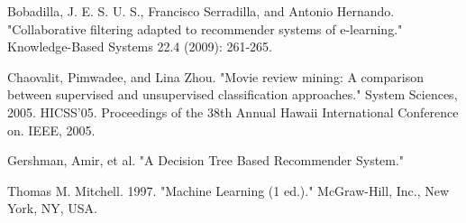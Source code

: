 \documentclass[twoside]{article}
\begin{document}
\begin{multicols}{2}
\begin{thebibliography}{9}
Bobadilla, J. E. S. U. S., Francisco Serradilla, and Antonio Hernando. "Collaborative filtering adapted to recommender systems of e-learning." Knowledge-Based Systems 22.4 (2009): 261-265.

Chaovalit, Pimwadee, and Lina Zhou. "Movie review mining: A comparison between supervised and unsupervised classification approaches." System Sciences, 2005. HICSS'05. Proceedings of the 38th Annual Hawaii International Conference on. IEEE, 2005.

 Gershman, Amir, et al. "A Decision Tree Based Recommender System."
 
Thomas M. Mitchell. 1997. "Machine Learning (1 ed.)." McGraw-Hill, Inc., New York, NY, USA.

\end{thebibliography}

\end{multicols}
\end{document}
